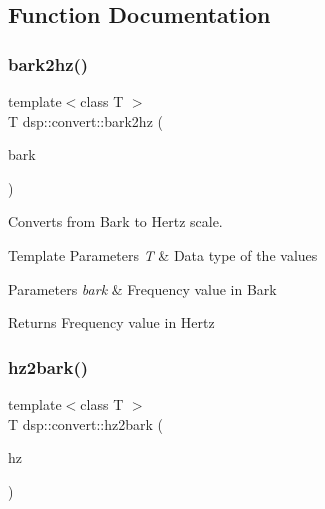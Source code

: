 \subsection{Function Documentation}
\mbox{\label{namespacedsp_1_1convert_ab44ee4c21ada8c728615e68891b05aa3}} 
\subsubsection{\texorpdfstring{bark2hz()}{bark2hz()}}
{\footnotesize\ttfamily template$<$class T $>$ \\
T dsp\+::convert\+::bark2hz (\begin{DoxyParamCaption}\item[{T}]{bark }\end{DoxyParamCaption})}



Converts from Bark to Hertz scale. 


\begin{DoxyTemplParams}{Template Parameters}
{\em T} & Data type of the values \\
\hline
\end{DoxyTemplParams}

\begin{DoxyParams}{Parameters}
{\em bark} & Frequency value in Bark \\
\hline
\end{DoxyParams}
\begin{DoxyReturn}{Returns}
Frequency value in Hertz 
\end{DoxyReturn}
\mbox{\label{namespacedsp_1_1convert_a0b152543bc9b736fcb0915da5306b323}} 
\subsubsection{\texorpdfstring{hz2bark()}{hz2bark()}}
{\footnotesize\ttfamily template$<$class T $>$ \\
T dsp\+::convert\+::hz2bark (\begin{DoxyParamCaption}\item[{T}]{hz }\end{DoxyParamCaption})}



